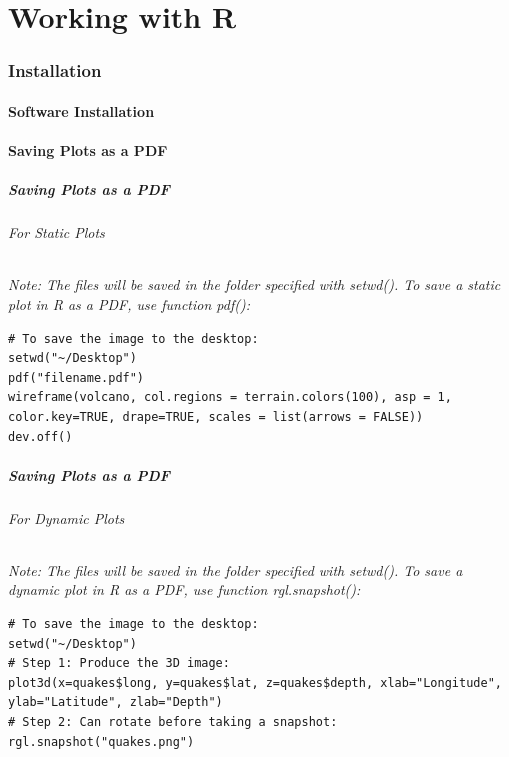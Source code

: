 \part{Working with R}


\section{Installation}
\subsection{Software Installation}
\subsection{Saving Plots as a PDF} 
\begin{frame}[fragile]
\frametitle{Saving Plots as a PDF}
  \framesubtitle{For Static Plots}

  \itshape Note: \normalfont The files will be saved in the folder specified with \ttfamily setwd(). \normalfont
  To save a static plot in \ttfamily R \normalfont as a PDF, use function \ttfamily pdf(): \normalfont

  \begin{lstlisting}
# To save the image to the desktop:
setwd("~/Desktop")
pdf("filename.pdf")
wireframe(volcano, col.regions = terrain.colors(100), asp = 1, color.key=TRUE, drape=TRUE, scales = list(arrows = FALSE))
dev.off()
  \end{lstlisting}

\end{frame}

\begin{frame}[fragile]
  \frametitle{Saving Plots as a PDF}
  \framesubtitle{For Dynamic Plots}

  \itshape Note: \normalfont The files will be saved in the folder specified with \ttfamily setwd(). \normalfont
  To save a dynamic plot in \ttfamily R \normalfont as a PDF, use function \ttfamily rgl.snapshot(): \normalfont

  \begin{lstlisting}
# To save the image to the desktop:
setwd("~/Desktop")
# Step 1: Produce the 3D image:
plot3d(x=quakes$long, y=quakes$lat, z=quakes$depth, xlab="Longitude", ylab="Latitude", zlab="Depth")
# Step 2: Can rotate before taking a snapshot:
rgl.snapshot("quakes.png")
  \end{lstlisting}

\end{frame}

